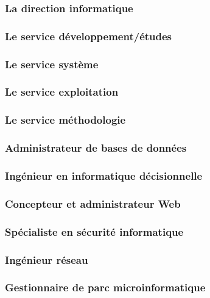 \documentclass[10pt,a4paper,oneside,titlepage]{report}
\begin{document}
\subsubsection{La direction informatique}

\subsubsection{Le service développement/études}

\subsubsection{Le service système}

\subsubsection{Le service exploitation}

\subsubsection{Le service méthodologie}

\subsubsection{Administrateur de bases de données}

\subsubsection{Ingénieur en informatique décisionnelle}

\subsubsection{Concepteur et administrateur Web}

\subsubsection{Spécialiste en sécurité informatique}

\subsubsection{Ingénieur réseau}

\subsubsection{Gestionnaire de parc microinformatique}
\end{document}

